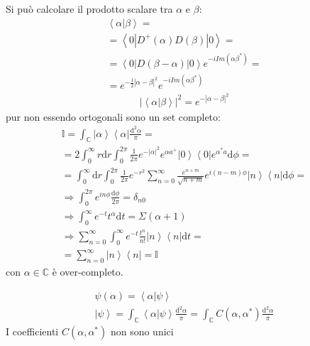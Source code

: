 Si può calcolare il prodotto scalare tra $\alpha$ e $\beta$:
\begin{equation}\begin{split}
\left\langle \alpha|\beta \right\rangle=\\
=\left\langle 0|D^+\left(\alpha\right)D\left(\beta\right)|0 \right\rangle=\\
=\left\langle 0|D\left(\beta-\alpha\right)|0 \right\rangle e^{-i Im{\left(\alpha\beta^*\right)}}=\\
=e^{-\frac{1}{2}|\alpha-\beta|^2}e^{-i Im{\left(\alpha\beta^*\right)}}
\end{split}\end{equation}
\begin{equation}\begin{split}
|\left\langle \alpha|\beta \right\rangle|^2=e^{-|\alpha-\beta|^2}
\end{split}\end{equation}
pur non essendo ortogonali sono un set completo:
\begin{equation}\begin{split}
\mathbb{I}=\int_{\mathbb{C} }{\left |\alpha \right\rangle\left\langle \alpha\right |\frac{\textrm{d}^2\alpha}{\pi }}=\\
=2\int_{0}^{\infty }{r \textrm{d}r}\int_{0}^{2\pi }{\frac{1}{2\pi }e^{-|\alpha|^2}e^{\alpha a^+}\left |0 \right\rangle\left\langle 0\right | e^{\alpha^*a}\textrm{d}\phi }=
 \\
=\int_{0}^{\infty }{ \textrm{d}r}\int_{0}^{2\pi }{\frac{1}{2\pi }e^{-r^2}\sum_{n=0}^{\infty }{\frac{e^{n+m}}{\sqrt{n+m}}}e^{i\left(n-m\right)\phi}\left |n \right\rangle\left\langle n\right | \textrm{d}\phi }=\\
\Longrightarrow \int_{0}^{2\pi }{e^{in\phi } \frac{\textrm{d}\phi}{2\pi }}=\delta_{n0}\\
\Longrightarrow \int_{0}^{\infty }{e^{-t}t^{\alpha} \textrm{d}t}=\Sigma\left(\alpha +1\right)\\
\Longrightarrow \sum_{n=0}^{\infty }{\int_{0}^{\infty }{e^{-t}\frac{t^n}{n!}\left |n \right\rangle\left\langle n\right | \textrm{d}t}}=\\
=\sum_{n=0}^{\infty }\left |n \right\rangle\left\langle n\right |=\mathbb{I}
\end{split}\end{equation}
con $\alpha\in\mathbb{C} $ è over-completo.

\begin{equation}\begin{split}
\psi \left(\alpha\right)=\left\langle \alpha|\psi  \right\rangle\\
\left |\psi  \right\rangle=\int_{\mathbb{C} }{\left\langle \alpha|\psi  \right\rangle\frac{\textrm{d}^2\alpha}{\pi }}=\int_{\mathbb{C} }{C\left(\alpha,\alpha^*\right)\frac{\textrm{d}^2\alpha}{\pi }}
\end{split}\end{equation}
I coefficienti $C\left(\alpha,\alpha^*\right)$ non sono unici

